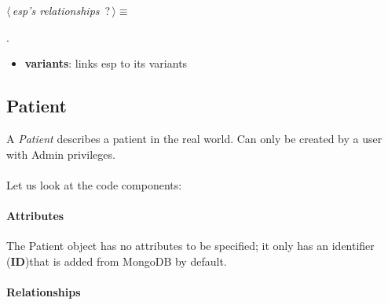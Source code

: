 	\begin{flushleft} \small
\begin{minipage}{\linewidth}\label{scrap13}\raggedright\small
{} $\langle\,${\itshape {esp's relationships}}\nobreak\ {\footnotesize {?}}$\,\rangle\equiv$
\vspace{-1ex}
\begin{list}{}{} \item

                
        {\NWsep}
\end{list}
\vspace{-1.5ex}
\footnotesize
\begin{list}{}{\setlength{\itemsep}{-\parsep}\setlength{\itemindent}{-\leftmargin}}
\item {\NWtxtMacroNoRef}.

\item{}
\end{list}
\end{minipage}\vspace{4ex}
\end{flushleft}
\begin{itemize}
 	\item \textbf{variants}: links esp to its variants
\end{itemize}


\subsection{Patient}
A \emph{Patient} describes a patient in the real world. Can only be created by a user with Admin privileges.
\\
\\Let us look at the code components:

\paragraph{Attributes}      

The Patient object has no attributes to be specified; it only has an identifier (\textbf{ID})that is added from MongoDB by default.

\paragraph{Relationships} 

